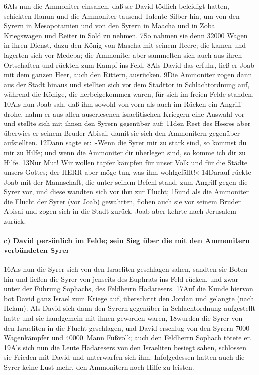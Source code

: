 6Als nun die Ammoniter einsahen, daß sie David tödlich beleidigt hatten,
schickten Hanun und die Ammoniter tausend Talente Silber hin, um von den
Syrern in Mesopotamien und von den Syrern in Maacha und in Zoba
Kriegswagen und Reiter in Sold zu nehmen. 7So nahmen sie denn 32000
Wagen in ihren Dienst, dazu den König von Maacha mit seinem Heere; die
kamen und lagerten sich vor Medeba; die Ammoniter aber sammelten sich
auch aus ihren Ortschaften und rückten zum Kampf ins Feld. 8Als David
das erfuhr, ließ er Joab mit dem ganzen Heer, auch den Rittern,
ausrücken. 9Die Ammoniter zogen dann aus der Stadt hinaus und stellten
sich vor dem Stadttor in Schlachtordnung auf, während die Könige, die
herbeigekommen waren, für sich im freien Felde standen. 10Als nun Joab
sah, daß ihm sowohl von vorn als auch im Rücken ein Angriff drohe, nahm
er aus allen auserlesenen israelitischen Kriegern eine Auswahl vor und
stellte sich mit ihnen den Syrern gegenüber auf; 11den Rest des Heeres
aber überwies er seinem Bruder Abisai, damit sie sich den Ammonitern
gegenüber aufstellten. 12Dann sagte er: »Wenn die Syrer mir zu stark
sind, so kommst du mir zu Hilfe; und wenn die Ammoniter dir überlegen
sind, so komme ich dir zu Hilfe. 13Nur Mut! Wir wollen tapfer kämpfen
für unser Volk und für die Städte unsers Gottes; der HERR aber möge tun,
was ihm wohlgefällt!« 14Darauf rückte Joab mit der Mannschaft, die unter
seinem Befehl stand, zum Angriff gegen die Syrer vor, und diese wandten
sich vor ihm zur Flucht; 15und als die Ammoniter die Flucht der Syrer
(vor Joab) gewahrten, flohen auch sie vor seinem Bruder Abisai und zogen
sich in die Stadt zurück. Joab aber kehrte nach Jerusalem zurück.

\hypertarget{c-david-persuxf6nlich-im-felde-sein-sieg-uxfcber-die-mit-den-ammonitern-verbuxfcndeten-syrer}{%
\paragraph{c) David persönlich im Felde; sein Sieg über die mit den
Ammonitern verbündeten
Syrer}\label{c-david-persuxf6nlich-im-felde-sein-sieg-uxfcber-die-mit-den-ammonitern-verbuxfcndeten-syrer}}

16Als nun die Syrer sich von den Israeliten geschlagen sahen, sandten
sie Boten hin und ließen die Syrer von jenseits des Euphrats ins Feld
rücken, und zwar unter der Führung Sophachs, des Feldherrn Hadaresers.
17Auf die Kunde hiervon bot David ganz Israel zum Kriege auf,
überschritt den Jordan und gelangte (nach Helam). Als David sich dann
den Syrern gegenüber in Schlachtordnung aufgestellt hatte und sie
handgemein mit ihnen geworden waren, 18wurden die Syrer von den
Israeliten in die Flucht geschlagen, und David erschlug von den Syrern
7000 Wagenkämpfer und 40000~Mann Fußvolk; auch den Feldherrn Sophach
tötete er. 19Als sich nun die Leute Hadaresers von den Israeliten
besiegt sahen, schlossen sie Frieden mit David und unterwarfen sich ihm.
Infolgedessen hatten auch die Syrer keine Lust mehr, den Ammonitern noch
Hilfe zu leisten.

